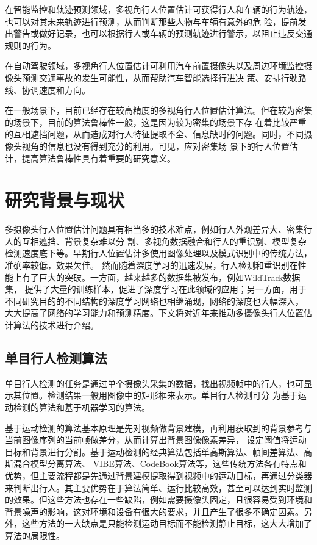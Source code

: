在智能监控和轨迹预测领域，多视角行人位置估计可获得行人和车辆的行为轨迹，也可以对其未来轨迹进行预测，从而判断那些人物与车辆有意外的危
险，提前发出警告或做好记录，也可以根据行人或车辆的预测轨迹进行警示，以阻止违反交通规则的行为。

在自动驾驶领域，多视角行人位置估计可利用汽车前置摄像头以及周边环境监控摄像头预测交通事故的发生可能性，从而帮助汽车智能选择行进决
策、安排行驶路线、协调速度和方向。

在一般场景下，目前已经存在较高精度的多视角行人位置估计算法。但在较为密集的场景下，目前的算法鲁棒性一般，这是因为较为密集的场景下存
在着比较严重的互相遮挡问题，从而造成对行人特征提取不全、信息缺时的问题。同时，不同摄像头视角的信息也没有得到充分的利用。可见，应对密集场
景下的行人位置估计，提高算法鲁棒性具有着重要的研究意义。



\section{研究背景与现状}

多摄像头行人位置估计问题具有相当多的技术难点，例如行人外观差异大、密集行人的互相遮挡、背景复杂难以分
割、多视角数据融合和行人的重识别、模型复杂检测速度底下等。早期行人位置估计多使用图像处理以及模式识别中的传统方法，准确率较低，效果欠佳。
然而随着深度学习的迅速发展，行人检测和重识别在性能上有了巨大的突破。一方面，越来越多的数据集被发布，例如WildTrack\cite{wildtrack}数据集，
提供了大量的训练样本，促进了深度学习在此领域的应用；另一方面，用于不同研究目的的不同结构的深度学习网络也相继涌现，网络的深度也大幅深入，
大大提高了网络的学习能力和预测精度。下文将对近年来推动多摄像头行人位置估计算法的技术进行介绍。

\subsection{单目行人检测算法}

单目行人检测的任务是通过单个摄像头采集的数据，找出视频帧中的行人，也可显示其位置。检测结果一般用图像中的矩形框来表示。单目行人检测可分
为基于运动检测的算法和基于机器学习的算法。

基于运动检测的算法基本原理是先对视频做背景建模，再利用获取到的背景参考与当前图像序列的当前帧做差分，从而计算出背景图像像素差异，
设定阈值将运动目标和背景进行分割。基于运动检测的经典算法包括单高斯算法、帧间差算法、高斯混合模型分离算法\cite{zivkovic2006efficient}、
VIBE算法\cite{barnich2010vibe}、CodeBook算法\cite{codebook}等，这些传统方法各有特点和优势，但主要流程都是先通过背景建模提取得到视频中的运动目标，再通过分类器来判断出行人。其主要优势在于算法简单、运行比较高效，甚至可以达到实时监测的效果。但这些方法也存在一些缺陷，例如需要摄像头固定，且很容易受到环境和背景噪声的影响，这对环境和设备有很大的要求，并且产生了很多不确定因素。另外，这些方法的一大缺点是只能检测运动目标而不能检测静止目标，这大大增加了算法的局限性。

